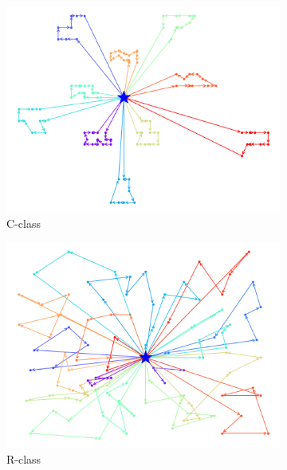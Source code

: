 \begin{figure}[H] %
	\label{fig:perf_ct_c1}
	\begin{subfigure}{.3\textwidth}
		\centering
		\includegraphics[width=1\linewidth]{figures/routes_c101.png}
		\caption{C-class}
		\label{fig:route_c}
	\end{subfigure}%
	\begin{subfigure}{.3\textwidth}
		\centering
		\includegraphics[width=1\linewidth]{figures/routes_r101.png}
		\caption{R-class}
		\label{fig:route_r}
	\end{subfigure}
	\begin{subfigure}{.3\textwidth}
		\centering

\end{subfigure}
\end{figure}
